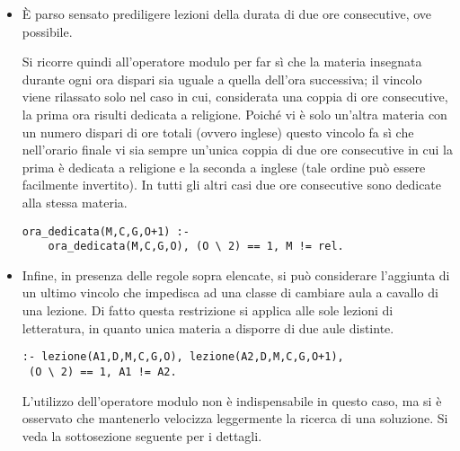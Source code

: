\begin{itemize}[leftmargin=0pt]
\item È parso sensato prediligere lezioni della durata di due ore consecutive, ove possibile. 
\begin{comment}
Sono state quindi realizzate due versioni alternative del presente vincolo: \\ \\
\textbf{Versione A} \\
La prima versione impone che durante le prime quattro ore di una giornata ogni classe segua due materie distinte, a cui spettano due ore consecutive ciascuna. Le ultime due ore sono invece lasciate libere da vincoli, così da permettere la gestione di quelle materie che hanno un numero dispari di ore settimanali (inglese e religione). Per ottenere quanto detto, si è introdotto un fatto aggiuntivo relativo al numero totale di ore in una giornata (linea 1). Si fa quindi uso dell'operatore modulo per far sì che la materia insegnata durante ogni ora dispari sia uguale a quella dell'ora successiva, ma solo se non si tratta della penultima ora: in questo modo le ultime due ore non vengono vincolate, come desiderato.
\begin{lstlisting}[frame=single]
ore_al_giorno(6).
:- ora_dedicata(M1,C,G,O), ora_dedicata(M2,C,G,O+1),
 (O \ 2) == 1, not ore_al_giorno(O+1), M1 != M2.
\end{lstlisting} 
\textbf{Versione B} \\
\end{comment}
Si ricorre quindi all'operatore modulo per far sì che la materia insegnata durante ogni ora dispari sia uguale a quella dell'ora successiva; il vincolo viene rilassato solo nel caso in cui, considerata una coppia di ore consecutive, la prima ora risulti dedicata a religione. Poiché vi è solo un'altra materia con un numero dispari di ore totali (ovvero inglese) questo vincolo fa sì che nell'orario finale vi sia sempre un'unica coppia di due ore consecutive in cui la prima è dedicata a religione e la seconda a inglese (tale ordine può essere facilmente invertito). In tutti gli altri casi due ore consecutive sono dedicate alla stessa materia.
\begin{lstlisting}[frame=single]
ora_dedicata(M,C,G,O+1) :-
	ora_dedicata(M,C,G,O), (O \ 2) == 1, M != rel. 
\end{lstlisting}

\item Infine, in presenza delle regole sopra elencate, si può considerare l'aggiunta di un ultimo vincolo che impedisca ad una classe di cambiare aula a cavallo di una lezione. Di fatto questa restrizione si applica alle sole lezioni di letteratura, in quanto unica materia a disporre di due aule distinte.
\begin{lstlisting}[frame=single]
:- lezione(A1,D,M,C,G,O), lezione(A2,D,M,C,G,O+1),
 (O \ 2) == 1, A1 != A2. 
\end{lstlisting}
L'utilizzo dell'operatore modulo non è indispensabile in questo caso, ma si è osservato che mantenerlo velocizza leggermente la ricerca di una soluzione. Si veda la sottosezione seguente per i dettagli.
\end{itemize}

